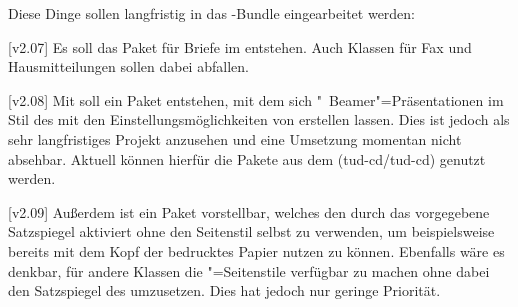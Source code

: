 Diese Dinge sollen langfristig in das \TUDScript-Bundle eingearbeitet werden:

[v2.07]
Es soll das Paket  für Briefe im \TUDCD entstehen. 
Auch Klassen für Fax und Hausmitteilungen sollen dabei abfallen.

[v2.08]
Mit  soll ein Paket entstehen, mit dem sich
"~Beamer"=Präsentationen im Stil des \TUDCDs mit den 
Einstellungsmöglichkeiten von \TUDScript erstellen lassen. Dies ist jedoch als 
sehr langfristiges Projekt anzusehen und eine Umsetzung momentan nicht 
absehbar. Aktuell können hierfür die Pakete aus dem \GitHubRepo(tud-cd/tud-cd) 
genutzt werden.

[v2.09]
Außerdem ist ein Paket  vorstellbar, welches den 
durch das \CD vorgegebene Satzspiegel aktiviert ohne den Seitenstil selbst zu 
verwenden, um beispielsweise bereits mit dem Kopf der \TnUD bedrucktes Papier 
nutzen zu können. Ebenfalls wäre es denkbar, für andere Klassen die 
"=Seitenstile verfügbar zu machen ohne dabei den 
Satzspiegel des \CDs umzusetzen. Dies hat jedoch nur geringe Priorität.
